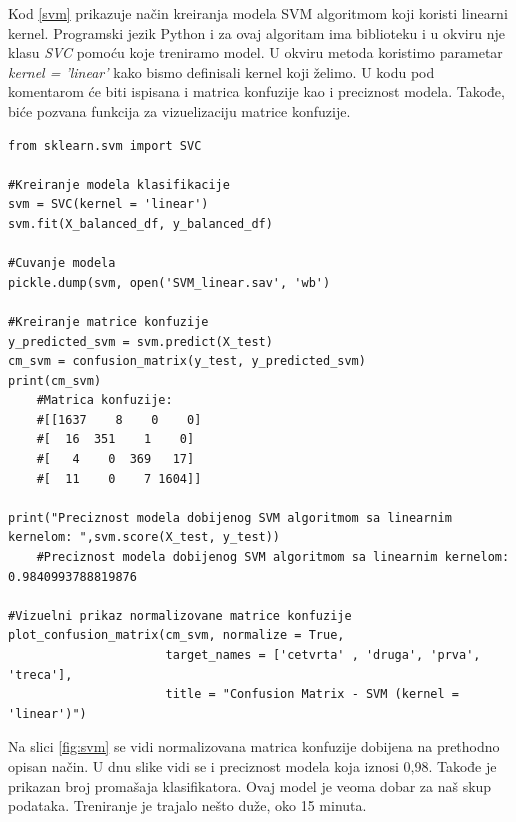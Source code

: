 \documentclass[a4paper]{article}
\begin{document}
Kod \ref{svm} prikazuje način kreiranja modela SVM algoritmom koji koristi linearni kernel. Programski jezik Python i za ovaj algoritam ima biblioteku i u okviru nje klasu {\em SVC} pomoću koje treniramo model. U okviru metoda koristimo parametar {\em kernel = 'linear'} kako bismo definisali kernel koji želimo. U kodu pod komentarom će biti ispisana i matrica konfuzije kao i preciznost modela. Takođe, biće pozvana funkcija za vizuelizaciju matrice konfuzije.
\\
\begin{lstlisting}[caption={Kreiranje modela algoritmom SVM sa linearnim kernelom i prikaz rezultata},frame=single, label=svm]
from sklearn.svm import SVC

#Kreiranje modela klasifikacije
svm = SVC(kernel = 'linear')
svm.fit(X_balanced_df, y_balanced_df)

#Cuvanje modela
pickle.dump(svm, open('SVM_linear.sav', 'wb')

#Kreiranje matrice konfuzije
y_predicted_svm = svm.predict(X_test)
cm_svm = confusion_matrix(y_test, y_predicted_svm)
print(cm_svm)
	#Matrica konfuzije:
	#[[1637    8    0    0]
	#[  16  351    1    0]
	#[   4    0  369   17]
	#[  11    0    7 1604]]

print("Preciznost modela dobijenog SVM algoritmom sa linearnim kernelom: ",svm.score(X_test, y_test))
	#Preciznost modela dobijenog SVM algoritmom sa linearnim kernelom: 0.9840993788819876

#Vizuelni prikaz normalizovane matrice konfuzije
plot_confusion_matrix(cm_svm, normalize = True,
                      target_names = ['cetvrta' , 'druga', 'prva', 'treca'],
                      title = "Confusion Matrix - SVM (kernel = 'linear')")
\end{lstlisting}

Na slici \ref{fig:svm} se vidi normalizovana matrica konfuzije dobijena na prethodno opisan način. U dnu slike vidi se i preciznost modela koja iznosi 0,98. Takođe je prikazan broj promašaja klasifikatora. Ovaj model je veoma dobar za naš skup podataka. Treniranje je trajalo nešto duže, oko 15 minuta.
\end{document}

